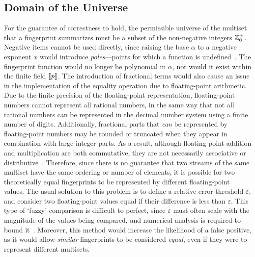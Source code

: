 \subsection{Domain of the Universe}
\label{subsec:fingerprint-analysis-universe}

For the guarantee of correctness to hold, the permissible universe of the multiset that a fingerprint summarizes must be a subset of the non-negative integers \( \mathbb{Z}_{0}^{+} \).
Negative items cannot be used directly, since raising the base \( \alpha \) to a negative exponent \( x \) would introduce \emph{poles}---points for which a function is undefined~\citep{beebe17}.
The fingerprint function would no longer be polynomial in \( \alpha \), nor would it exist within the finite field \( \llbracket p\rrbracket \).
The introduction of fractional terms would also cause an issue in the implementation of the equality operation due to floating-point arithmetic.
Due to the finite precision of the floating-point representation, floating-point numbers cannot represent all rational numbers, in the same way that not all rational numbers can be represented in the decimal number system using a finite number of digits.
Additionally, fractional parts that \emph{can} be represented by floating-point numbers may be rounded or truncated when they appear in combination with large integer parts.
As a result, although floating-point addition and multiplication are both commutative, they are not necessarily associative or distributive~\citep{muller10}.
Therefore, since there is no guarantee that two streams of the same multiset have the same ordering or number of elements, it is possible for two theoretically equal fingerprints to be represented by different floating-point values.
The usual solution to this problem is to define a relative error threshold \( \varepsilon \), and consider two floating-point values equal if their difference is less than \( \varepsilon \).
This type of `fuzzy' comparison is difficult to perfect, since \( \varepsilon \) must often scale with the magnitude of the values being compared, and numerical analysis is required to bound it~\citep{higham02}.
Moreover, this method would increase the likelihood of a false positive, as it would allow \emph{similar} fingerprints to be considered \emph{equal}, even if they were to represent different multisets.

